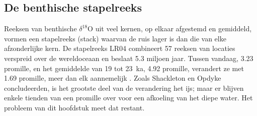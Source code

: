 \subsection*{De benthische stapelreeks}

Reeksen van benthische $\delta^{18}$O uit veel kernen, op elkaar afgestemd en gemiddeld, vormen een stapelreeks (stack) waarvan de ruis
lager is dan die van elke afzonderlijke kern. De stapelreeks LR04 combineert 57 reeksen van locaties verspreid over de
wereldoceaan en beslaat 5.3 miljoen jaar. Tussen vandaag, \num{3.23} promille, en het gemiddelde van
\num{19} tot \qty{23}{ka}, \num{4.92} promille, verandert ze met \num{1.69} promille, meer dan elk
aannemelijk . Zoals Shackleton en Opdyke concludeerden, is het grootste deel van de verandering het ijs;
maar er blijven enkele tienden van een promille over voor een afkoeling van het diepe water. Het probleem van dit hoofdstuk meet dat restant.

